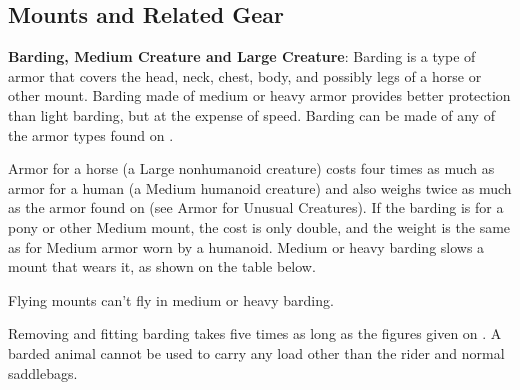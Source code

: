 \subsection{Mounts and Related Gear}
\textbf{Barding, Medium Creature and Large Creature}: Barding is a type of armor that covers the head, neck, chest, body, and possibly legs of a horse or other mount. Barding made of medium or heavy armor provides better protection than light barding, but at the expense of speed. Barding can be made of any of the armor types found on .

Armor for a horse (a Large nonhumanoid creature) costs four times as much as armor for a human (a Medium humanoid creature) and also weighs twice as much as the armor found on  (see Armor for Unusual Creatures). If the barding is for a pony or other Medium mount, the cost is only double, and the weight is the same as for Medium armor worn by a humanoid. Medium or heavy barding slows a mount that wears it, as shown on the table below.

Flying mounts can't fly in medium or heavy barding.

Removing and fitting barding takes five times as long as the figures given on . A barded animal cannot be used to carry any load other than the rider and normal saddlebags.


